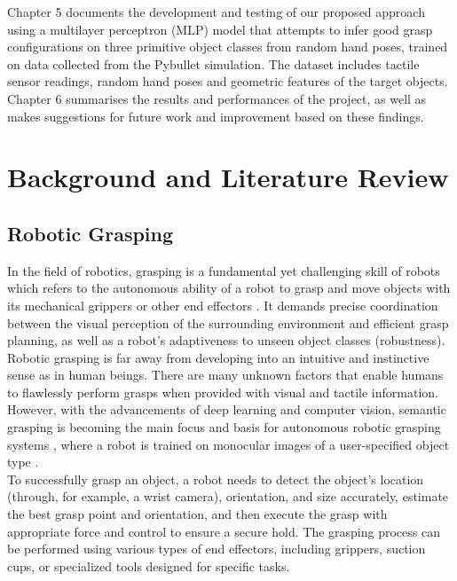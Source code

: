 \documentclass[11pt, a4paper]{report}
\begin{document}
Chapter 5 documents the development and testing of our proposed approach using a multilayer perceptron (MLP) model that attempts to infer good grasp configurations on three primitive object classes from random hand poses, trained on data collected from the Pybullet simulation. The dataset includes tactile sensor readings, random hand poses and geometric features of the target objects.\\

Chapter 6 summarises the results and performances of the project, as well as makes suggestions for future work and improvement based on these findings.



\chapter{Background and Literature Review}
\label{chap:2}


\section{Robotic Grasping}
\label{sec:2.1}
In the field of robotics, grasping is a fundamental yet challenging skill of robots which refers to the autonomous ability of a robot to grasp and move objects with its mechanical grippers or other end effectors \cite{zhang2022robotic}. It demands precise coordination between the visual perception of the surrounding environment and efficient grasp planning, as well as a robot's adaptiveness to unseen object classes (robustness).\\

Robotic grasping is far away from developing into an intuitive and instinctive sense as in human beings. There are many unknown factors that enable humans to flawlessly perform grasps when provided with visual and tactile information. However, with the advancements of deep learning and computer vision, semantic grasping is becoming the main focus and basis for autonomous robotic grasping systems \cite{zhang2022robotic}, where a robot is trained on monocular images of a user-specified object type \cite{jang2017endtoend}.\\

To successfully grasp an object, a robot needs to detect the object's location (through, for example, a wrist camera), orientation, and size accurately, estimate the best grasp point and orientation, and then execute the grasp with appropriate force and control to ensure a secure hold. The grasping process can be performed using various types of end effectors, including grippers, suction cups, or specialized tools designed for specific tasks.\\
\end{document}
